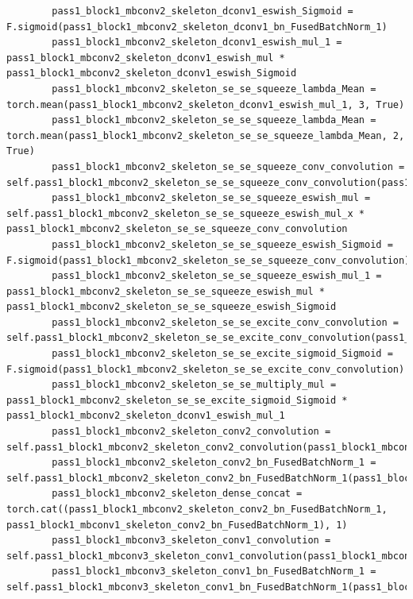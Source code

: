 \documentclass{fisatprojectfinal}
\begin{document}
\begin{appendices}
\begin{lstlisting}
        pass1_block1_mbconv2_skeleton_dconv1_eswish_Sigmoid = F.sigmoid(pass1_block1_mbconv2_skeleton_dconv1_bn_FusedBatchNorm_1)
        pass1_block1_mbconv2_skeleton_dconv1_eswish_mul_1 = pass1_block1_mbconv2_skeleton_dconv1_eswish_mul * pass1_block1_mbconv2_skeleton_dconv1_eswish_Sigmoid
        pass1_block1_mbconv2_skeleton_se_se_squeeze_lambda_Mean = torch.mean(pass1_block1_mbconv2_skeleton_dconv1_eswish_mul_1, 3, True)
        pass1_block1_mbconv2_skeleton_se_se_squeeze_lambda_Mean = torch.mean(pass1_block1_mbconv2_skeleton_se_se_squeeze_lambda_Mean, 2, True)
        pass1_block1_mbconv2_skeleton_se_se_squeeze_conv_convolution = self.pass1_block1_mbconv2_skeleton_se_se_squeeze_conv_convolution(pass1_block1_mbconv2_skeleton_se_se_squeeze_lambda_Mean)
        pass1_block1_mbconv2_skeleton_se_se_squeeze_eswish_mul = self.pass1_block1_mbconv2_skeleton_se_se_squeeze_eswish_mul_x * pass1_block1_mbconv2_skeleton_se_se_squeeze_conv_convolution
        pass1_block1_mbconv2_skeleton_se_se_squeeze_eswish_Sigmoid = F.sigmoid(pass1_block1_mbconv2_skeleton_se_se_squeeze_conv_convolution)
        pass1_block1_mbconv2_skeleton_se_se_squeeze_eswish_mul_1 = pass1_block1_mbconv2_skeleton_se_se_squeeze_eswish_mul * pass1_block1_mbconv2_skeleton_se_se_squeeze_eswish_Sigmoid
        pass1_block1_mbconv2_skeleton_se_se_excite_conv_convolution = self.pass1_block1_mbconv2_skeleton_se_se_excite_conv_convolution(pass1_block1_mbconv2_skeleton_se_se_squeeze_eswish_mul_1)
        pass1_block1_mbconv2_skeleton_se_se_excite_sigmoid_Sigmoid = F.sigmoid(pass1_block1_mbconv2_skeleton_se_se_excite_conv_convolution)
        pass1_block1_mbconv2_skeleton_se_se_multiply_mul = pass1_block1_mbconv2_skeleton_se_se_excite_sigmoid_Sigmoid * pass1_block1_mbconv2_skeleton_dconv1_eswish_mul_1
        pass1_block1_mbconv2_skeleton_conv2_convolution = self.pass1_block1_mbconv2_skeleton_conv2_convolution(pass1_block1_mbconv2_skeleton_se_se_multiply_mul)
        pass1_block1_mbconv2_skeleton_conv2_bn_FusedBatchNorm_1 = self.pass1_block1_mbconv2_skeleton_conv2_bn_FusedBatchNorm_1(pass1_block1_mbconv2_skeleton_conv2_convolution)
        pass1_block1_mbconv2_skeleton_dense_concat = torch.cat((pass1_block1_mbconv2_skeleton_conv2_bn_FusedBatchNorm_1, pass1_block1_mbconv1_skeleton_conv2_bn_FusedBatchNorm_1), 1)
        pass1_block1_mbconv3_skeleton_conv1_convolution = self.pass1_block1_mbconv3_skeleton_conv1_convolution(pass1_block1_mbconv2_skeleton_dense_concat)
        pass1_block1_mbconv3_skeleton_conv1_bn_FusedBatchNorm_1 = self.pass1_block1_mbconv3_skeleton_conv1_bn_FusedBatchNorm_1(pass1_block1_mbconv3_skeleton_conv1_convolution)

\end{lstlisting}
\end{appendices}
\end{document}
